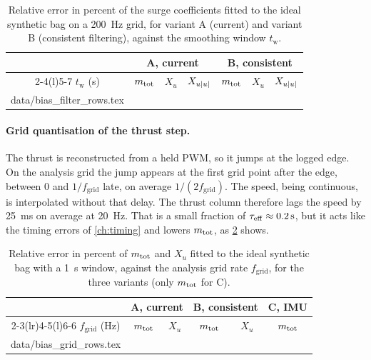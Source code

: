 \begin{table}[htbp]
\centering
\caption{Relative error in percent of the surge coefficients fitted to the ideal synthetic bag
on a \qty{200}{\hertz} grid, for variant A (current) and variant B (consistent filtering), against
the smoothing window $t_\mathrm{w}$.}
\label{tab:bias-filter}
\small
\begin{tabular}{@{}c ccc ccc@{}}
\toprule
& \multicolumn{3}{c}{A, current} & \multicolumn{3}{c}{B, consistent} \\
\cmidrule(lr){2-4}\cmidrule(l){5-7}
$t_\mathrm{w}$ (\unit{\second}) & $m_\mathrm{tot}$ & $X_u$ & $X_{u|u|}$ & $m_\mathrm{tot}$ & $X_u$ & $X_{u|u|}$ \\
\midrule
{} data/bias_filter_rows.tex
\bottomrule
\end{tabular}
\end{table}
\FloatBarrier

\paragraph{Grid quantisation of the thrust step.} The thrust is reconstructed from a held PWM,
so it jumps at the logged edge. On the analysis grid the jump appears at the first grid point
after the edge, between $0$ and $1/f_\mathrm{grid}$ late, on average $1/(2f_\mathrm{grid})$.
The speed, being continuous, is interpolated without that delay. The thrust column therefore
lags the speed by \qty{25}{\milli\second} on average at \qty{20}{\hertz}. That is a small fraction
of $\tau_\mathrm{eff} \approx \qty{0.2}{\second}$, but it acts like the timing errors of \cref{ch:timing}
and lowers $m_\mathrm{tot}$, as \cref{tab:bias-grid} shows.

\begin{table}[htbp]
\centering
\caption{Relative error in percent of $m_\mathrm{tot}$ and $X_u$ fitted to the ideal synthetic bag with a
\qty{1}{\second} window, against the analysis grid rate $f_\mathrm{grid}$, for the three variants
(only $m_\mathrm{tot}$ for C).}
\label{tab:bias-grid}
\small
\begin{tabular}{@{}c cc cc c@{}}
\toprule
& \multicolumn{2}{c}{A, current} & \multicolumn{2}{c}{B, consistent} & C, IMU \\
\cmidrule(lr){2-3}\cmidrule(lr){4-5}\cmidrule(l){6-6}
$f_\mathrm{grid}$ (\unit{\hertz}) & $m_\mathrm{tot}$ & $X_u$ & $m_\mathrm{tot}$ & $X_u$ & $m_\mathrm{tot}$ \\
\midrule
{} data/bias_grid_rows.tex
\bottomrule
\end{tabular}
\end{table}
\FloatBarrier

